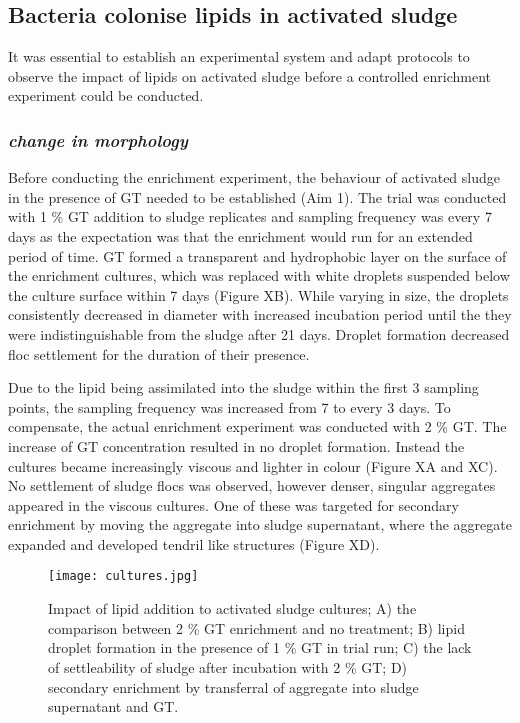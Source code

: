 \documentclass[11pt]{article}
\begin{document}
\subsection{Bacteria colonise lipids in activated sludge}
It was essential to establish an experimental system and adapt protocols to observe the impact of lipids on activated sludge before a controlled enrichment experiment could be conducted. 

\subsubsection{\emph{change in morphology}}
Before conducting the enrichment experiment, the behaviour of activated sludge in  the presence of GT needed to be established (Aim 1). The trial was conducted with 1 \% GT  addition to sludge replicates and sampling frequency was every 7 days as the expectation was that the enrichment would run for an extended period of time. GT formed a transparent and hydrophobic layer on the surface of the enrichment cultures, which was replaced with white droplets suspended below the culture surface within 7 days (Figure XB). While varying in size, the droplets consistently decreased in diameter with increased incubation period until the they were indistinguishable from the sludge after 21 days. Droplet formation decreased floc settlement for the duration of their presence. 


Due to the lipid being assimilated into the sludge within the first 3 sampling points, the sampling frequency was increased from 7 to every 3 days. To compensate, the actual enrichment experiment was conducted with 2 \% GT. The increase of GT concentration resulted in no droplet formation. Instead the cultures became increasingly viscous and lighter in colour (Figure XA and XC). No settlement of sludge flocs was observed, however denser, singular aggregates appeared in the viscous cultures. One of these was targeted for secondary enrichment by moving the aggregate into sludge supernatant, where the aggregate expanded and developed tendril like structures (Figure XD).

\begin{figure}
\texttt{[image: cultures.jpg]}
\caption{Impact of lipid addition to activated sludge cultures; A) the comparison between 2 \% GT enrichment and no treatment; B) lipid droplet formation in the presence of 1 \% GT in trial run; C) the lack of settleability of sludge after incubation with 2 \% GT; D) secondary enrichment by transferral of aggregate into sludge supernatant and GT.}
\end{figure}
\FloatBarrier
\end{document}
